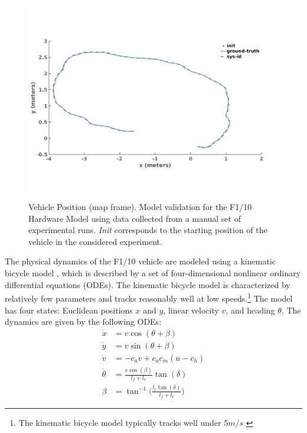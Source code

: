 \documentclass[manuscript,screen,review]{acmart}
\begin{document}
\begin{figure}[htbp]%
  \centering
    \includegraphics[width=0.70\linewidth]{figures/sys_id2_2.pdf}
  \caption{Vehicle Position (map frame). Model validation for the F1/10 Hardware Model using data collected from a manual set of experimental runs. \emph{Init} corresponds to the starting position of the vehicle in the considered experiment.}
  \label{fig:validation}
\end{figure}%


The physical dynamics of the F1/10 vehicle are modeled using a kinematic bicycle model \cite{Rajamani2012}, which is described by a set of four-dimensional nonlinear ordinary differential equations (ODEs). The kinematic bicycle model is characterized by relatively few parameters and tracks reasonably well at low speeds.\footnote{ The kinematic bicycle model typically tracks well under $5 m/s$ \cite{ivanov2020case}} The model has four states: Euclidean positions $x$ and $y$, linear velocity $v$, and heading $\theta$. The dynamics are given by the following ODEs: 
\begin{align*}
    \Dot{x} & = v\cos(\theta +\beta)\\
    \Dot{y} & = v\sin(\theta + \beta)\\
    \Dot{v} & = -c_av +c_ac_m(u-c_h)\\
    \Dot{\theta} & = \frac{v\cos(\beta)}{l_f+l_r}\tan(\delta)\\
    \beta &= \tan^{-1}\Big(\frac{l_r\tan(\delta)}{l_f+l_r}\Big)
\end{align*}
\end{document}
